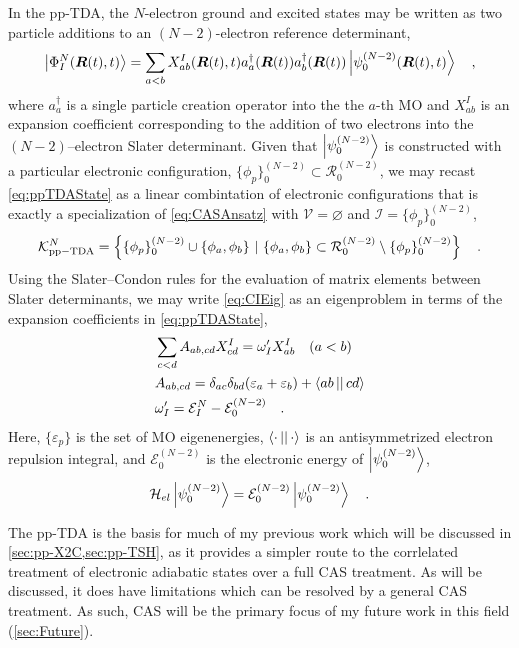 In the pp-TDA, the $N$-electron ground and excited states may be written as two
particle additions to an $(N-2)$-electron reference determinant,
\begin{equation}
\left\vert \Phi_I^N (\boldsymbol{R}(t),t) \right\rangle = \sum_{a < b} X_{ab}^I(\boldsymbol{R}(t),t)
a_a^\dagger(\boldsymbol{R}(t)) a_b^\dagger (\boldsymbol{R}(t))
\left\vert \psi_0^{(N-2)}(\boldsymbol{R}(t),t) \right\rangle \quad, \label{eq:ppTDAState}
\end{equation}
where $a_a^\dagger$ is a single particle creation operator into the the $a$-th
MO and $X_{ab}^I$ is an expansion coefficient corresponding to the addition of
two electrons into the $(N-2)$--electron Slater determinant. Given that
$\left\vert \psi_0^{(N-2)} \right\rangle$ is constructed with a particular electronic
configuration, $\{ \phi_p \}^{(N-2)}_0 \subset \mathcal{R}^{(N-2)}_0$, we may recast
\cref{eq:ppTDAState} as a linear combintation of electronic configurations that
is exactly a specialization of \cref{eq:CASAnsatz} with
$\mathcal{V} = \varnothing$ and $\mathcal{I} = \{ \phi_p \}^{(N-2)}_0$,
\begin{equation}
\mathcal{K}_\mathrm{pp-TDA}^N =
\left\lbrace \{ \phi_p \}^{(N-2)}_0 \cup \{\phi_a,\phi_b \} \text{ }\vert\text{ } 
\{ \phi_a,\phi_b \} \subset \mathcal{R}^{(N-2)}_0 \setminus \{\phi_p \}^{(N-2)}_0 
\right\rbrace \quad.
\end{equation}
Using the Slater--Condon rules for the evaluation of matrix elements between
Slater determinants\cite{Szabo}, we may write \cref{eq:CIEig} as an eigenproblem
in terms of the expansion coefficients in \cref{eq:ppTDAState},
\begin{align}
&\sum_{c < d} A_{ab,cd} X_{cd}^I = \omega'_I X_{ab}^I \quad (a < b)
\label{eq:ppTDAEig}\\
&A_{ab,cd} = \delta_{ac}\delta_{bd}(\varepsilon_a + \varepsilon_b) + 
  \left\langle ab \left\vert  \right\vert cd \right\rangle \\
&\omega'_I = \mathcal{E}^{N}_I - \mathcal{E}^{(N-2)}_0
\quad.
\end{align}
Here, $\{\varepsilon_p\}$ is the set of MO eigenenergies,
$\left\langle \cdot \left\vert  \right\vert \cdot \right\rangle$ is an antisymmetrized electron repulsion integral,
and $\mathcal{E}_0^{(N-2)}$ is the electronic energy of $\left\vert \psi_0^{(N-2)} \right\rangle$,
\begin{equation}
\mathcal{H}_{el}\left\vert \psi_0^{(N-2)} \right\rangle = \mathcal{E}_0^{(N-2)}\left\vert \psi_0^{(N-2)} \right\rangle
\quad.
\end{equation}

The pp-TDA is the basis for much of my previous work which will be discussed in
\cref{sec:pp-X2C,sec:pp-TSH}, as it provides a simpler route to the corrlelated
treatment of electronic adiabatic states over a full CAS treatment. As will be
discussed, it does have limitations which can be resolved by a general CAS
treatment. As such, CAS will be the primary focus of my future work in this
field (\cref{sec:Future}).
